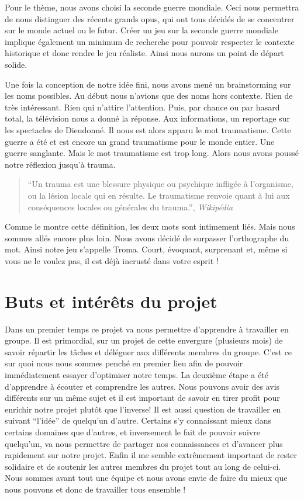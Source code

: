 \documentclass[a4paper, 11pt]{report}
\begin{document}
Pour le thème, nous avons choisi la seconde guerre mondiale. Ceci nous permettra de nous distinguer des récents grands opus, qui ont tous décidés de se concentrer sur le monde actuel ou le futur. Créer un jeu sur la seconde guerre mondiale implique également un minimum de recherche pour pouvoir respecter le contexte historique et donc rendre le jeu réaliste. Ainsi nous aurons un point de départ solide.

Une fois la conception de notre idée fini, nous avons mené un brainstorming sur les noms possibles. Au début nous n'avions que des noms hors contexte. Rien de très intéressant. Rien qui n'attire l'attention. Puis, par chance ou par hasard total, la télévision nous a donné la réponse. Aux informations, un reportage sur les spectacles de Dieudonné. Il nous est alors apparu le mot traumatisme. Cette guerre a été et est encore un grand traumatisme pour le monde entier. Une guerre sanglante. Mais le mot traumatisme est trop long. Alors nous avons poussé notre réflexion jusqu'à trauma.

\begin{quote}
``Un trauma est une blessure physique ou psychique infligée à l'organisme, ou la lésion locale qui en résulte. Le traumatisme renvoie quant à lui aux conséquences locales ou générales du trauma.'', \emph{Wikipédia}
\end{quote}

Comme le montre cette définition, les deux mots sont intimement liés. Mais nous sommes allés encore plus loin. Nous avons décidé de surpasser l'orthographe du mot. Ainsi notre jeu s'appelle Troma. Court, évoquant, surprenant et, même si vous ne le voulez pas, il est déjà incrusté dans votre esprit !

\newpage
\section{Buts et intérêts du projet}\label{buts-et-intuxe9ruxeats-du-projet}

Dans un premier temps ce projet va nous permettre d'apprendre à travailler en groupe. Il est primordial, sur un projet de cette envergure (plusieurs mois) de savoir répartir les tâches et déléguer aux différents membres du groupe. C'est ce sur quoi nous nous sommes penché en premier lieu afin de pouvoir immédiatement essayer d'optimiser notre temps. La deuxième étape a été d'apprendre à écouter et comprendre les autres. Nous pouvons avoir des avis différents sur un même sujet et il est important de savoir en tirer profit pour enrichir notre projet plutôt que l'inverse! Il est aussi question de travailler en suivant ``l'idée'' de quelqu'un d'autre. Certains s'y connaissant mieux dans certains domaines que d'autres, et inversement le fait de pouvoir suivre quelqu'un, va nous permettre de partager nos connaissances et d'avancer plus rapidement sur notre projet. Enfin il me semble extrêmement important de rester solidaire et de soutenir les autres membres du projet tout au long de celui-ci. Nous sommes avant tout une équipe et nous avons envie de faire du mieux que nous pouvons et donc de travailler tous ensemble !
\end{document}
